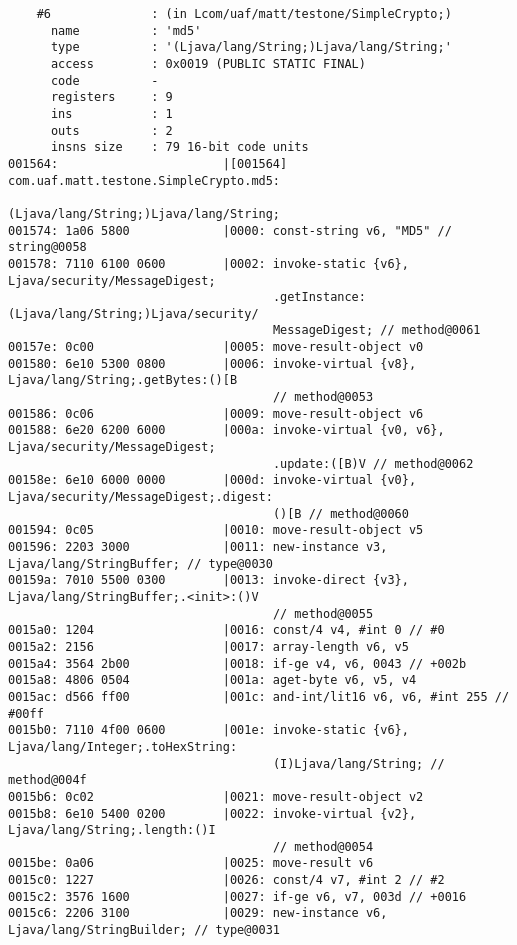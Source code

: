 \begin{lstlisting}
    #6              : (in Lcom/uaf/matt/testone/SimpleCrypto;)
      name          : 'md5'
      type          : '(Ljava/lang/String;)Ljava/lang/String;'
      access        : 0x0019 (PUBLIC STATIC FINAL)
      code          -
      registers     : 9
      ins           : 1
      outs          : 2
      insns size    : 79 16-bit code units
001564:                       |[001564] com.uaf.matt.testone.SimpleCrypto.md5:
                                        (Ljava/lang/String;)Ljava/lang/String;
001574: 1a06 5800             |0000: const-string v6, "MD5" // string@0058
001578: 7110 6100 0600        |0002: invoke-static {v6}, Ljava/security/MessageDigest;
                                     .getInstance:(Ljava/lang/String;)Ljava/security/
                                     MessageDigest; // method@0061
00157e: 0c00                  |0005: move-result-object v0
001580: 6e10 5300 0800        |0006: invoke-virtual {v8}, Ljava/lang/String;.getBytes:()[B
                                     // method@0053
001586: 0c06                  |0009: move-result-object v6
001588: 6e20 6200 6000        |000a: invoke-virtual {v0, v6}, Ljava/security/MessageDigest;
                                     .update:([B)V // method@0062
00158e: 6e10 6000 0000        |000d: invoke-virtual {v0}, Ljava/security/MessageDigest;.digest:
                                     ()[B // method@0060
001594: 0c05                  |0010: move-result-object v5
001596: 2203 3000             |0011: new-instance v3, Ljava/lang/StringBuffer; // type@0030
00159a: 7010 5500 0300        |0013: invoke-direct {v3}, Ljava/lang/StringBuffer;.<init>:()V
                                     // method@0055
0015a0: 1204                  |0016: const/4 v4, #int 0 // #0
0015a2: 2156                  |0017: array-length v6, v5
0015a4: 3564 2b00             |0018: if-ge v4, v6, 0043 // +002b
0015a8: 4806 0504             |001a: aget-byte v6, v5, v4
0015ac: d566 ff00             |001c: and-int/lit16 v6, v6, #int 255 // #00ff
0015b0: 7110 4f00 0600        |001e: invoke-static {v6}, Ljava/lang/Integer;.toHexString:
                                     (I)Ljava/lang/String; // method@004f
0015b6: 0c02                  |0021: move-result-object v2
0015b8: 6e10 5400 0200        |0022: invoke-virtual {v2}, Ljava/lang/String;.length:()I
                                     // method@0054
0015be: 0a06                  |0025: move-result v6
0015c0: 1227                  |0026: const/4 v7, #int 2 // #2
0015c2: 3576 1600             |0027: if-ge v6, v7, 003d // +0016
0015c6: 2206 3100             |0029: new-instance v6, Ljava/lang/StringBuilder; // type@0031

\end{lstlisting}
